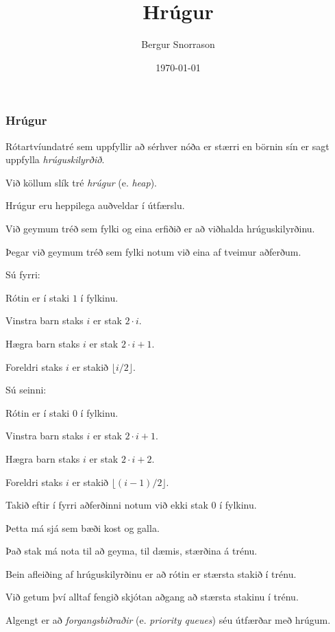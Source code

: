 \title{Hrúgur}
\author{Bergur Snorrason}
\date{\today}



\frame{\titlepage}

{
	\frametitle{Hrúgur}
	{
		\item<1-> Rótartvíundatré sem uppfyllir að sérhver nóða er stærri en börnin sín er sagt uppfylla \emph{hrúguskilyrðið}.
		\item<2-> Við köllum slík tré \emph{hrúgur} (e. \emph{heap}).
		\item<3-> Hrúgur eru heppilega auðveldar í útfærslu.
		\item<4-> Við geymum tréð sem fylki og eina erfiðið er að viðhalda hrúguskilyrðinu.
	}
}

{
	{
		\item<1-> Þegar við geymum tréð sem fylki notum við eina af tveimur aðferðum.
		\item<2-> Sú fyrri:
		{
			\item<3-> Rótin er í staki $1$ í fylkinu.
			\item<4-> Vinstra barn staks $i$ er stak $2 \cdot i$.
			\item<5-> Hægra barn staks $i$ er stak $2 \cdot i + 1$.
			\item<6-> Foreldri staks $i$ er stakið $\lfloor i/2 \rfloor$.
		}
		\item<7-> Sú seinni:
		{
			\item<8-> Rótin er í staki $0$ í fylkinu.
			\item<9-> Vinstra barn staks $i$ er stak $2\cdot i + 1$.
			\item<10-> Hægra barn staks $i$ er stak $2\cdot i + 2$.
			\item<11-> Foreldri staks $i$ er stakið $\lfloor (i - 1)/2 \rfloor$.
		}
		\item<12-> Takið eftir í fyrri aðferðinni notum við ekki stak $0$ í fylkinu.
		\item<13-> Þetta má sjá sem bæði kost og galla.
		\item<14-> Það stak má nota til að geyma, til dæmis, stærðina á trénu.
	}
}

{
	{
		\item<1-> Bein afleiðing af hrúguskilyrðinu er að rótin er stærsta stakið í trénu.
		\item<2-> Við getum því alltaf fengið skjótan aðgang að stærsta stakinu í trénu.
		\item<3-> Algengt er að \emph{forgangsbiðraðir} (e. \emph{priority queues}) séu útfærðar með hrúgum.
	}
}

